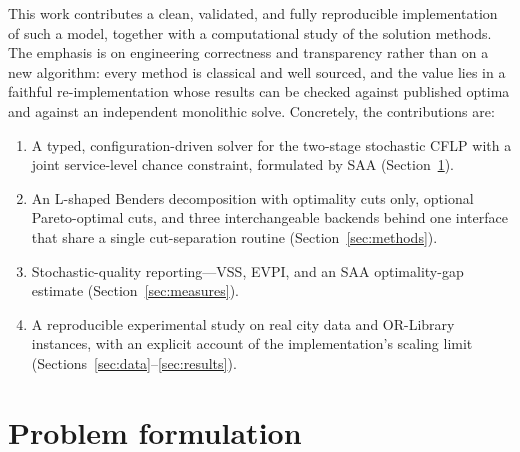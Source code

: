\documentclass[11pt]{article}
\begin{document}
This work contributes a clean, validated, and fully reproducible implementation
of such a model, together with a computational study of the solution methods. The
emphasis is on engineering correctness and transparency rather than on a new
algorithm: every method is classical and well sourced, and the value lies in a
faithful re-implementation whose results can be checked against published optima
and against an independent monolithic solve. Concretely, the contributions are:
\begin{enumerate}
  \item A typed, configuration-driven solver for the two-stage stochastic CFLP
  with a joint service-level chance constraint, formulated by SAA
  (Section~\ref{sec:model}).
  \item An L-shaped Benders decomposition with optimality cuts only, optional
  Pareto-optimal cuts, and three interchangeable backends behind one interface
  that share a single cut-separation routine (Section~\ref{sec:methods}).
  \item Stochastic-quality reporting---VSS, EVPI, and an SAA optimality-gap
  estimate (Section~\ref{sec:measures}).
  \item A reproducible experimental study on real city data and OR-Library
  instances, with an explicit account of the implementation's scaling limit
  (Sections~\ref{sec:data}--\ref{sec:results}).
\end{enumerate}

\section{Problem formulation}
\label{sec:model}
\end{document}
